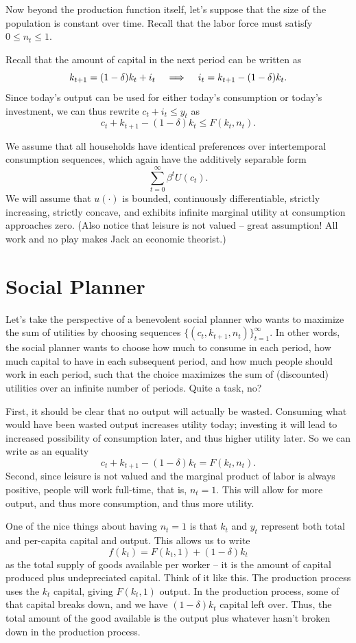 \documentclass[12pt]{article}
\newcommand{\Lindent}{\hspace{.4cm} \Longrightarrow \hspace{.4cm}}
\theoremstyle{definition}
\begin{document}
Now beyond the production function itself, let's suppose that the size of the population is constant over time. Recall that the labor force must satisfy $0 \leq n_t \leq 1$. 

Recall that the amount of capital in the next period can be written as 
	\[k_{t+1} = (1 - \delta)k_t + i_t \Lindent i_t = k_{t+1} - (1 - \delta)k_t.\]
Since today's output can be used for either today's consumption or today's investment, we can thus rewrite $c_t + i_t \leq y_t$ as 
	\[c_t + k_{t+1} - (1 - \delta)k_t \leq F(k_t, n_t).	\]	

We assume that all households have identical preferences over intertemporal consumption sequences, which again have the additively separable form 
	\[	\sum_{t=0}^{\infty} \beta^t U(c_t).\]
We will assume that $u(\cdot)$ is bounded, continuously differentiable, strictly increasing, strictly concave, and exhibits infinite marginal utility at consumption approaches zero. (Also notice that leisure is not valued -- great assumption! All work and no play makes Jack an economic theorist.) 


\section{Social Planner}

Let's take the perspective of a benevolent social planner who wants to maximize the sum of utilities by choosing sequences $\{(c_t, k_{t+1}, n_t) \}_{t=1}^{\infty}$. In other words, the social planner wants to choose how much to consume in each period, how much capital to have in each subsequent period, and how much people should work in each period, such that the choice maximizes the sum of (discounted) utilities over an infinite number of periods. Quite a task, no?

First, it should be clear that no output will actually be wasted. Consuming what would have been wasted output increases utility today; investing it will lead to increased possibility of consumption later, and thus higher utility later. So we can write as an equality
	\[c_t + k_{t+1} - (1 - \delta)k_t = F(k_t, n_t).	\]
Second, since leisure is not valued and the marginal product of labor is always positive, people will work full-time, that is, $n_t=1$. This will allow for more output, and thus more consumption, and thus more utility. 

One of the nice things about having $n_t=1$ is that $k_t$ and $y_t$ represent both total and per-capita capital and output. This allows us to write
	\[f(k_t) = F(k_t,1) + (1 - \delta)k_t\]
as the total supply of goods available per worker -- it is the amount of capital produced plus undepreciated capital. Think of it like this. The production process uses the $k_t$ capital, giving $F(k_t,1)$ output. In the production process, some of that capital breaks down, and we have $(1 - \delta)k_t$ capital left over. Thus, the total amount of the good available  is the output plus whatever hasn't broken down in the production process.
\end{document}
